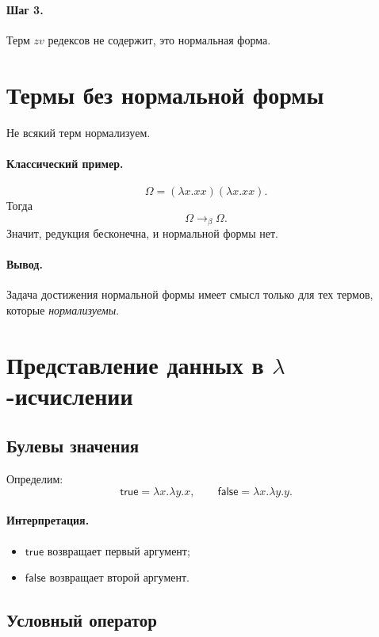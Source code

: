 \documentclass[12pt,a4paper]{article}
\theoremstyle{remark}
\begin{document}
\paragraph{Шаг 3.}
Терм $zv$ редексов не содержит, это нормальная форма.

\section{Термы без нормальной формы}

Не всякий терм нормализуем.

\paragraph{Классический пример.}
\[
\Omega=(\lambda x.xx)(\lambda x.xx).
\]
Тогда
\[
\Omega \to_\beta \Omega.
\]
Значит, редукция бесконечна, и нормальной формы нет.

\paragraph{Вывод.}
Задача достижения нормальной формы имеет смысл только для тех термов, которые \emph{нормализуемы}.

\section{Представление данных в $\lambda$-исчислении}

\subsection{Булевы значения}

Определим:
\[
\mathsf{true}=\lambda x.\lambda y.x,
\qquad
\mathsf{false}=\lambda x.\lambda y.y.
\]

\paragraph{Интерпретация.}
\begin{itemize}
    \item $\mathsf{true}$ возвращает первый аргумент;
    \item $\mathsf{false}$ возвращает второй аргумент.
\end{itemize}

\subsection{Условный оператор}
\end{document}
